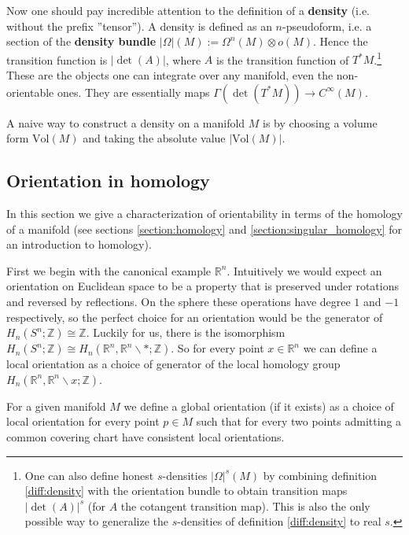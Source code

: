    \begin{remark}\label{diff:honest_density}
        Now one should pay incredible attention to the definition of a \textbf{density} (i.e. without the prefix ''tensor''). A density is defined as an $n$-pseudoform, i.e. a section of the \textbf{density bundle} $|\Omega|(M):=\Omega^n(M)\otimes o(M)$. Hence the transition function is $|\det(A)|$, where $A$ is the transition function of $T^*M$.\footnote{One can also define honest $s$-densities $|\Omega|^s(M)$ by combining definition \ref{diff:density} with the orientation bundle to obtain transition maps $|\det(A)|^s$ (for $A$ the cotangent transition map). This is also the only possible way to generalize the $s$-densities of definition \ref{diff:density} to real $s$.}  These are the objects one can integrate over any manifold, even the non-orientable ones. They are essentially maps $\Gamma(\det(T^*M))\rightarrow C^\infty(M)$.

        A naive way to construct a density on a manifold $M$ is by choosing a volume form $\text{Vol}(M)$ and taking the absolute value $|\text{Vol}(M)|$.
    \end{remark}

\subsection{Orientation in homology}

    In this section we give a characterization of orientability in terms of the homology of a manifold (see sections \ref{section:homology} and \ref{section:singular_homology} for an introduction to homology).

    First we begin with the canonical example $\mathbb{R}^n$. Intuitively we would expect an orientation on Euclidean space to be a property that is preserved under rotations and reversed by reflections. On the sphere these operations have degree $1$ and $-1$ respectively, so the perfect choice for an orientation would be the generator of $H_n(S^n;\mathbb{Z})\cong\mathbb{Z}$. Luckily for us, there is the isomorphism $H_n(S^n;\mathbb{Z})\cong H_n(\mathbb{R}^n, \mathbb{R}^n\backslash\ast;\mathbb{Z})$. So for every point $x\in\mathbb{R}^n$ we can define a local orientation as a choice of generator of the local homology group $H_n(\mathbb{R}^n, \mathbb{R}^n\backslash x;\mathbb{Z})$.

    For a given manifold $M$ we define a global orientation (if it exists) as a choice of local orientation for every point $p\in M$ such that for every two points admitting a common covering chart have consistent local orientations.

